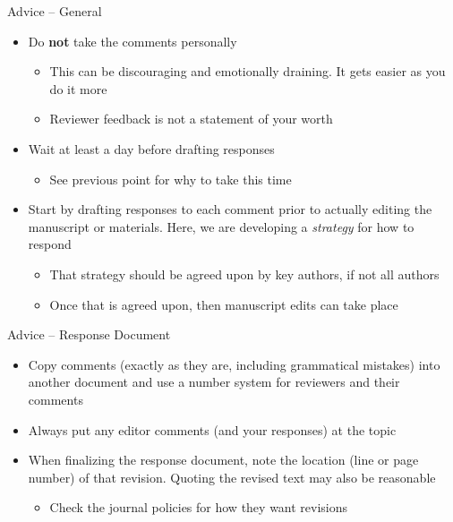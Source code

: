 \documentclass[aspectratio=169]{beamer}
\begin{document}
\begin{frame}{Advice -- General}
	\begin{itemize}
		\item Do \textbf{not} take the comments personally
		\begin{itemize}
			\item This can be discouraging and emotionally draining. It gets easier as you do it more
			\item Reviewer feedback is not a statement of your worth
		\end{itemize}
		\item Wait at least a day before drafting responses
		\begin{itemize}
			\item See previous point for why to take this time
		\end{itemize}
		\item Start by drafting responses to each comment prior to actually editing the manuscript or materials. Here, we are developing a \textit{strategy} for how to respond
		\begin{itemize}
			\item That strategy should be agreed upon by key authors, if not all authors
			\item Once that is agreed upon, then manuscript edits can take place
		\end{itemize}
	\end{itemize}
\end{frame}

\begin{frame}{Advice -- Response Document}
	\begin{itemize}
		\item Copy comments (exactly as they are, including grammatical mistakes) into another document and use a number system for reviewers and their comments
		\item Always put any editor comments (and your responses) at the topic
		\item When finalizing the response document, note the location (line or page number) of that revision. Quoting the revised text may also be reasonable
		\begin{itemize}
			\item Check the journal policies for how they want revisions
		\end{itemize}
	\end{itemize}
\end{frame}
\end{document}
